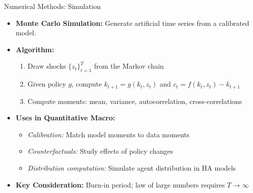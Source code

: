 \begin{frame}{Numerical Methods: Simulation}
\begin{itemize}
\item \textbf{Monte Carlo Simulation:} Generate artificial time series from a calibrated model.

\medskip
\item \textbf{Algorithm:}
\begin{enumerate}
    \item Draw shocks $\{z_t\}_{t=1}^T$ from the Markov chain
    \item Given policy $g$, compute $k_{t+1} = g(k_t, z_t)$ and $c_t = f(k_t, z_t) - k_{t+1}$
    \item Compute moments: mean, variance, autocorrelation, cross-correlations
\end{enumerate}

\medskip
\item \textbf{Uses in Quantitative Macro:}
\begin{itemize}
    \item \emph{Calibration:} Match model moments to data moments
    \item \emph{Counterfactuals:} Study effects of policy changes
    \item \emph{Distribution computation:} Simulate agent distribution in HA models
\end{itemize}

\medskip
\item \textbf{Key Consideration:} Burn-in period; law of large numbers requires $T \to \infty$
\end{itemize}
\end{frame}

